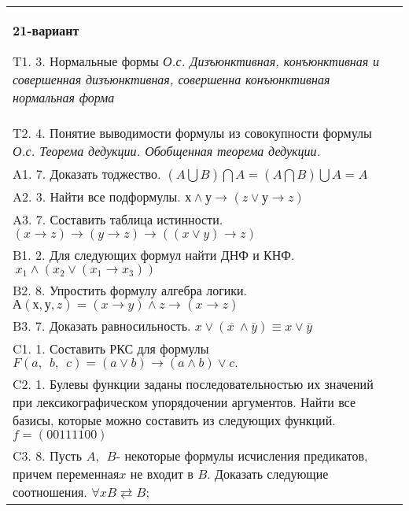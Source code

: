 \documentclass{article}
\begin{document}
\begin{tabular}{m{17cm}}
\textbf{21-вариант}
\newline

T1. 3. Нормальные формы \emph{О.с. Дизъюнктивная, конъюнктивная и совершенная дизъюнктивная, совершенна конъюнктивная нормальная форма} \\
T2. 4. Понятие выводимости формулы из совокупности формулы \emph{О.с. Теорема дедукции. Обобщенная теорема дедукции.} \\
A1. 7. Доказать тоджество. \((A\bigcup B)\bigcap A = (A\bigcap B)\bigcup A = A\) \\
A2. 3. Найти все подформулы. \(х \land у \rightarrow (z \vee у \rightarrow z)\) \\
A3. 7. Составить таблица истинности. \((x \rightarrow z) \rightarrow (y \rightarrow z) \rightarrow ((x \vee y) \rightarrow z)\) \\
B1. 2. Для следующих формул найти ДНФ и КНФ. \(\ x_{1} \land (x_{2} \vee (x_{1} \rightarrow x_{3}))\) \\
B2. 8. Упростить формулу алгебра логики. \(А(х,у,z) = (x \rightarrow y) \land z \rightarrow (x \rightarrow z)\) \\
B3. 7. Доказать равносильность. \(x \vee \left( \overline{x\ } \land \overline{y} \right) \equiv x \vee \overline{y}\) \\
C1. 1. Составить РКС для формулы \(F(a,\ \ b,\ \ c) = (a \vee b) \rightarrow (a \land b) \vee c.\) \\
C2. 1. Булевы функции заданы последовательностью их значений при лексикографическом упорядочении аргументов. Найти все базисы, которые можно составить из следующих функций.\(f = (00111100)\) \\
C3. 8. Пусть \(A,\ \ B\)- некоторые формулы исчисления предикатов, причем переменная\(x\) не входит в \(B\). Доказать следующие соотношения. \(\forall xB \rightleftarrows B\); \\

\end{tabular}
\vspace{1cm}
\end{document}
